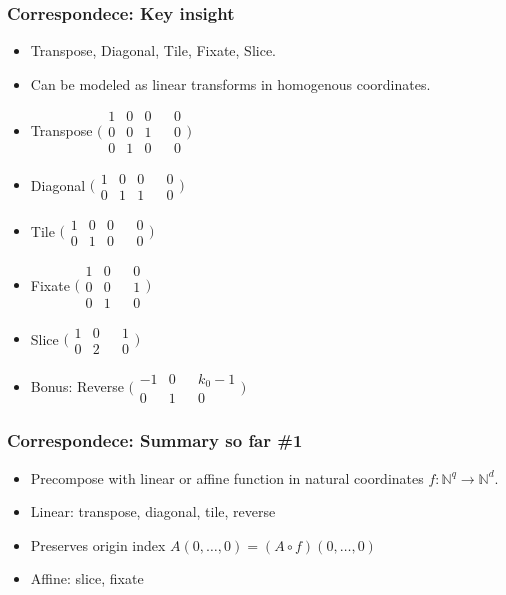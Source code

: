 \documentclass[xetex,mathserif,serif]{beamer}
\newcommand\Nat{\mathbb{N}}
\begin{document}
\begin{frame}
  \frametitle{Correspondece: Key insight}
  \begin{itemize}%
    \item Transpose, Diagonal, Tile, Fixate, Slice.
    \item Can be modeled as linear transforms in homogenous coordinates.
    \item Transpose \(\bigg(\begin{smallmatrix} 1 & 0 & 0 && 0 \\ 0 & 0 & 1 && 0 \\ 0 & 1 & 0 && 0 \end{smallmatrix}\bigg)\)
    \item Diagonal \(\big(\begin{smallmatrix} 1 & 0 & 0 && 0 \\ 0 & 1 & 1 && 0 \end{smallmatrix}\big)\)
    \item Tile \(\big(\begin{smallmatrix} 1 & 0 & 0 && 0 \\ 0 & 1 & 0 && 0 \end{smallmatrix}\big)\)
    \item Fixate \(\bigg(\begin{smallmatrix} 1 & 0 && 0 \\ 0 & 0 && 1 \\ 0 & 1 && 0 \end{smallmatrix}\bigg)\)
    \item Slice \(\big(\begin{smallmatrix} 1 & 0 && 1 \\ 0 & 2 && 0 \end{smallmatrix}\big)\)
    \item Bonus: Reverse \(\big(\begin{smallmatrix} -1 & 0 && k_0-1 \\ 0 & 1 && 0 \end{smallmatrix}\big)\)
  \end{itemize}
\end{frame}

\begin{frame}
  \frametitle{Correspondece: Summary so far \#1}
  \begin{itemize}%
    \item Precompose with linear or affine function in natural coordinates \(f : \Nat^q \to \Nat^d\).
    \item Linear: transpose, diagonal, tile, reverse
    \item Preserves origin index \(A(0, \dots, 0) = (A \circ f)(0, \dots, 0)\)
    \item Affine: slice, fixate
  \end{itemize}
\end{frame}
\end{document}
